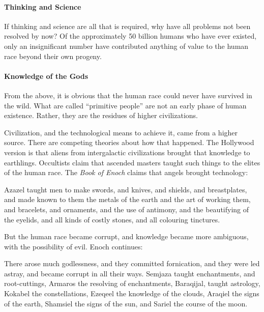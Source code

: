 \paragraph{Thinking and Science}


If thinking and science are all that is required, why have all problems not been resolved by now? Of the approximately 50 billion humans who have ever existed, only an insignificant number have contributed anything of value to the human race beyond their own progeny.

\paragraph{Knowledge of the Gods}


From the above, it is obvious that the human race could never have survived in the wild. What are called ``primitive people'' are not an early phase of human existence. Rather, they are the residues of higher civilizations.

Civilization, and the technological means to achieve it, came from a higher source. There are competing theories about how that happened. The Hollywood version is that aliens from intergalactic civilizations brought that knowledge to earthlings. Occultists claim that ascended masters taught such things to the elites of the human race. The \emph{Book of Enoch} claims that angels brought technology:


\begin{quotex}
Azazel taught men to make swords, and knives, and shields, and breastplates, and made known to them the metals of the earth and the art of working them, and bracelets, and ornaments, and the use of antimony, and the beautifying of the eyelids, and all kinds of costly stones, and all colouring tinctures.
\end{quotex}


But the human race became corrupt, and knowledge became more ambiguous, with the possibility of evil. Enoch continues:

\begin{quotex}
There arose much godlessness, and they committed fornication, and they were led astray, and became corrupt in all their ways. Semjaza taught enchantments, and root-cuttings, Armaros the resolving of enchantments, Baraqijal, taught astrology, Kokabel the constellations, Ezeqeel the knowledge of the clouds, Araqiel the signs of the earth, Shamsiel the signs of the sun, and Sariel the course of the moon.
\end{quotex}


